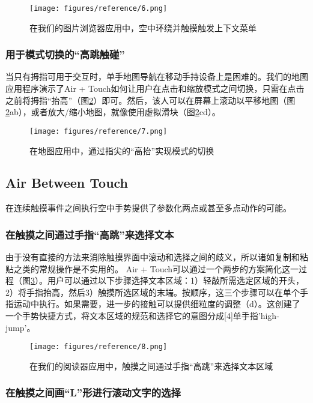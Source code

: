 \begin{figure}
\centering
\texttt{[image: figures/reference/6.png]}
\caption{在我们的图片浏览器应用中，空中环绕并触摸触发上下文菜单}
\label{fig:ref_6}
\end{figure}

\subsubsection{用于模式切换的“高跳触碰”}

当只有拇指可用于交互时，单手地图导航在移动手持设备上是困难的。我们的地图应用程序演示了Air + Touch如何让用户在点击和缩放模式之间切换，只需在点击之前将拇指“抬高”（图\ref{fig:ref_7}）即可。然后，该人可以在屏幕上滚动以平移地图（图\ref{fig:ref_7}ab），或者放大/缩小地图，就像使用虚拟滑块（图\ref{fig:ref_7}cd）。

\begin{figure}
\centering
\texttt{[image: figures/reference/7.png]}
\caption{在地图应用中，通过指尖的“高抬”实现模式的切换}
\label{fig:ref_7}
\end{figure}

\subsection{Air Between Touch}

在连续触摸事件之间执行空中手势提供了参数化两点或甚至多点动作的可能。

\subsubsection{在触摸之间通过手指“高跳”来选择文本}

由于没有直接的方法来消除触摸界面中滚动和选择之间的歧义，所以诸如复制和粘贴之类的常规操作是不实用的。 Air + Touch可以通过一个两步的方案简化这一过程（图\ref{fig:ref_8}）。用户可以通过以下步骤选择文本区域：1）轻敲所需选定区域的开头，2）将手指抬高，然后3）触摸所选区域的末端。按顺序，这三个步骤可以在单个手指运动中执行。如果需要，进一步的接触可以提供细粒度的调整（d）。这创建了一个手势快捷方式，将文本区域的规范和选择它的意图分成[4]单手指'high-jump'。

\begin{figure}
\centering
\texttt{[image: figures/reference/8.png]}
\caption{在我们的阅读器应用中，触摸之间通过手指“高跳”来选择文本区域}
\label{fig:ref_8}
\end{figure}

\subsubsection{在触摸之间画“L”形进行滚动文字的选择}

